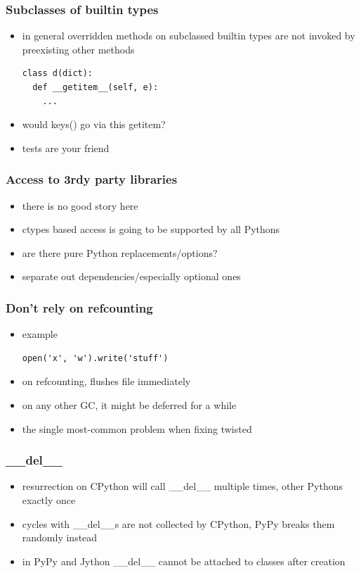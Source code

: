 \documentclass[utf8x, 14pt]{beamer}
\begin{document}
\begin{frame}[fragile]
  \frametitle{Subclasses of builtin types}
  \begin{itemize}
    \item in general overridden methods on subclassed builtin types are not 
      invoked by preexisting other methods
      \begin{verbatim}
class d(dict):
  def __getitem__(self, e):
    ...
      \end{verbatim}
    \item would {\ttfamily keys()} go via this getitem?
    \item tests are your friend
  \end{itemize}
\end{frame}

\begin{frame}
  \frametitle{Access to 3rdy party libraries}
  \begin{itemize}
    \item there is no good story here
    \item ctypes based access is going to be supported by all Pythons
    \item are there pure Python replacements/options?
    \item separate out dependencies/especially optional ones
  \end{itemize}
\end{frame}

\begin{frame}[fragile]
  \frametitle{Don't rely on refcounting}
  \begin{itemize}
    \item example
      \begin{verbatim}
open('x', 'w').write('stuff')
      \end{verbatim}
    \item on refcounting, flushes file immediately
    \item on any other GC, it might be deferred for
      a while
    \item the single most-common problem when fixing twisted
  \end{itemize}
\end{frame}

\begin{frame}
  \frametitle{\_\_del\_\_}
  \begin{itemize}
    \item resurrection on CPython will call {\ttfamily \_\_del\_\_} multiple times,
      other Pythons exactly once
    \item cycles with \_\_del\_\_s are not collected by CPython,
      PyPy breaks them randomly instead
    \item in PyPy and Jython \_\_del\_\_ cannot be attached to classes after creation
  \end{itemize}
\end{frame}
\end{document}

